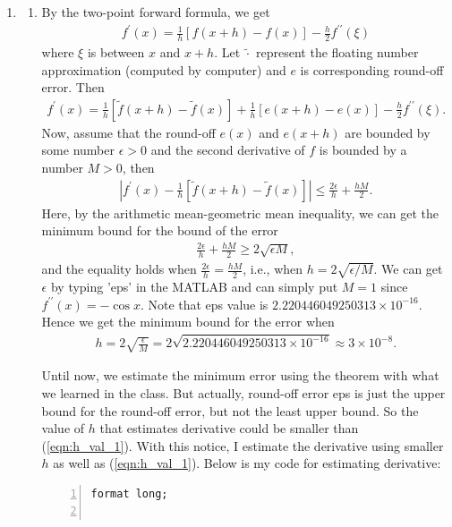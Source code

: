\documentclass{article}
\begin{document}
\begin{enumerate}
    \item \begin{enumerate}[wide=10pt]
        \item By the two-point forward formula, we get \begin{align*}
            f^\prime(x) = \frac{1}{h}[f(x+h)-f(x)]-\frac{h}{2}f^{\prime\prime}(\xi)
        \end{align*} where $\xi$ is between $x$ and $x+h$. Let $\tilde{\cdot}$ represent the floating number approximation (computed by computer) and $e$ is corresponding round-off error. Then \begin{align*}
            f^\prime(x) = \frac{1}{h}[\tilde f(x+h)-\tilde f(x)] + \frac{1}{h}[e(x+h)-e(x)] -\frac{h}{2}f^{\prime\prime}(\xi).
        \end{align*} Now, assume that the round-off $e(x)$ and $e(x+h)$ are bounded by some number $\epsilon>0$ and the second derivative of $f$ is bounded by a number $M>0$, then \begin{align}
            \left | f^\prime(x) - \frac{1}{h}[\tilde f(x+h)-\tilde f(x)] \right |
            \le \frac{2\epsilon}{h} + \frac{hM}{2}.
        \end{align} Here, by the arithmetic mean-geometric mean inequality, we can get the minimum bound for the bound of the error \begin{align*}
            \frac{2\epsilon}{h} + \frac{hM}{2} \ge 2\sqrt{\epsilon M},
        \end{align*} and the equality holds when $\frac{2\epsilon}{h}=\frac{hM}{2}$, i.e., when $h=2\sqrt{\epsilon /M}$. We can get $\epsilon$ by typing 'eps' in the MATLAB and can simply put $M=1$ since $f^{\prime\prime}(x)=-\cos x$. Note that eps value is $2.220446049250313\times 10^{-16}$. Hence we get the minimum bound for the error when \begin{align} \label{eqn:h_val_1}
            h = 2\sqrt{\frac{\epsilon}{M}} = 2\sqrt{2.220446049250313\times 10^{-16}} \approx 3\times 10^{-8}.
        \end{align}
        
        Until now, we estimate the minimum error using the theorem with what we learned in the class. But actually, round-off error eps is just the upper bound for the round-off error, but not the least upper bound. So the value of $h$ that estimates derivative could be smaller than (\ref{eqn:h_val_1}). With this notice, I estimate the derivative using smaller $h$ as well as (\ref{eqn:h_val_1}). Below is my code for estimating derivative: \begin{lstlisting}[frame=single, numbers=left, style=Matlab-editor]
format long;


\end{lstlisting}
\end{enumerate}
\end{enumerate}
\end{document}

